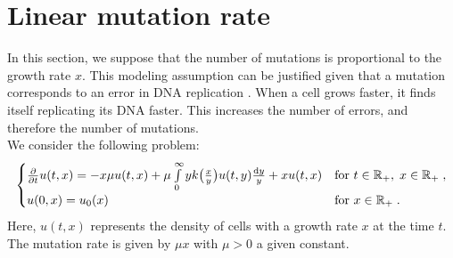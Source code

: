 \documentclass[11pt]{amsart}
\newcommand{\diff}{\,\mathrm{d}}
\begin{document}






\section{Linear mutation rate}

In this section, we suppose that the number of mutations is proportional to the growth rate $x$. This modeling assumption can be justified given that a mutation corresponds to an error in DNA replication \cite{pray2008dna}. When a cell grows faster, it finds itself replicating its DNA faster. This increases the number of errors, and therefore the number of mutations.\\

We consider the following problem:
\begin{equation}
    \begin{cases}
	\frac{\partial}{\partial t}u(t,x) = - x\mu u(t,x) + \mu \int\limits_{0}^{\infty} y k\big( \frac{x}{y}\big) u(t,y) \frac{\mathrm dy}{y} + xu(t,x)
	& \text{for }t \in \mathbb{R}_+, \; x \in \mathbb{R}_+ \; ,
	\\
	u(0, x) = u_0(x)
	& \text{for }x \in \mathbb{R}_+
	\; .
    \end{cases}
    \label{eq:linearmutrate}
\end{equation}
Here, $u(t,x)$ represents the density of cells with a growth rate $x$ at the time $t$. The mutation rate is given by $\mu x$ with $\mu>0$ a given constant. \\
\end{document}
